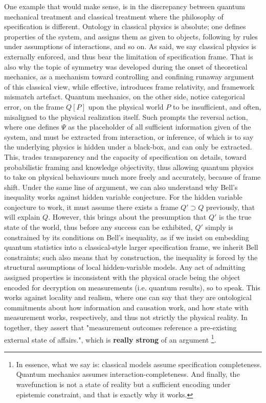 \documentclass[%
 reprint,
 amsmath,amssymb,
 aps,
]{revtex4-2}
\begin{document}
One example that would make sense, is in the discrepancy between quantum mechanical treatment and classical treatment where the philosophy of specification is different. Ontology in classical physics is absolute; one defines properties of the system, and assigns them as given to objects, following by rules under assumptions of interactions, and so on. As said, we say classical physics is externally enforced, and thus bear the limitation of specification frame. That is also why the topic of symmetry was developed during the onset of theoretical mechanics, as a mechanism toward controlling and confining runaway argument of this classical view, while effective, introduces frame relativity, and framework mismatch artefact. Quantum mechanics, on the other side, notice categorical error, on the frame $Q[P]$ upon the physical world $P$ to be insufficient, and often, misaligned to the physical realization itself. Such prompts the reversal action, where one defines $\Psi$ as the placeholder of all sufficient information given of the system, and must be extracted from interaction, or inference, of which is to say the underlying physics is hidden under a black-box, and can only be extracted. This, trades transparency and the capacity of specification on details, toward probabilistic framing and knowledge objectivity, thus allowing quantum physics to take on physical behaviours much more freely and accurately, because of frame shift. Under the same line of argument, we can also understand why Bell's inequality works against hidden variable conjecture. For the hidden variable conjecture to work, it must assume there exists a frame $Q'\supset Q$ previously, that will explain $Q$. However, this brings about the presumption that $Q'$ is the true state of the world, thus before any success can be exhibited, $Q'$ simply is constrained by its conditions on Bell's inequality, as if we insist on embedding quantum statistics into a classical-style larger specification frame, we inherit Bell constraints; such also means that by construction, the inequality is forced by the structural assumptions of local hidden-variable models. Any act of admitting assigned properties is inconsistent with the physical oracle being the object encoded for decryption on measurements (i.e. quantum results), so to speak. This works against locality and realism, where one can say that they are ontological commitments about how information and causation work, and how state with measurement works, respectively, and thus not strictly the physical reality. In together, they assert that "measurement outcomes reference a pre-existing external state of affairs.", which is \textbf{really strong} of an argument \footnote{In essence, what we say is: classical models assume specification completeness. Quantum mechanics assumes interaction-completeness. And finally, the wavefunction is not a state of reality but a sufficient encoding under epistemic constraint, and that is exactly why it works.}. 
\end{document}
